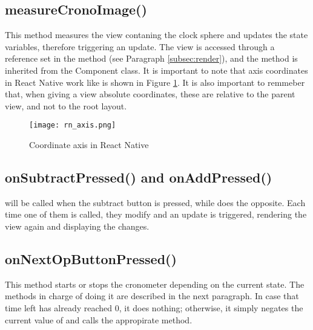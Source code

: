 \subsection{measureCronoImage()}

\lstset{style=myhtml}


This method measures the view contaning the clock sphere and updates the state variables, therefore triggering an update. The view is accessed through a reference set in the  method (see Paragraph \ref{subsec:render}), and the  method is inherited from the Component class. It is important to note that axis coordinates in React Native work like is shown in Figure \ref{fig:rnaxis}. It is also important to remmeber that, when giving a view absolute coordinates, these are relative to the parent view, and not to the root layout.

\begin{figure}[H]
	\centering
	\texttt{[image: rn\_axis.png]}
	\caption{Coordinate axis in React Native\label{fig:rnaxis}}
\end{figure}

\subsection{onSubtractPressed() and onAddPressed()}

\lstset{style=myhtml}


 will be called when the subtract button is pressed, while  does the opposite. Each time one of them is called, they modify  and an update is triggered, rendering the view again and displaying the changes.

\subsection{onNextOpButtonPressed()}
\label{subsec:onnextopbuttonpressed}

\lstset{style=myhtml}


This method starts or stops the cronometer depending on the current state. The methods in charge of doing it are described in the next paragraph. In case that time left has already reached 0, it does nothing; otherwise, it simply negates the current value of  and calls the appropirate method.

